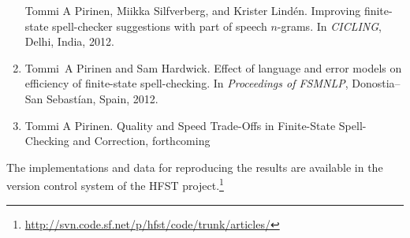 \documentclass[officiallayout,final]{unihelcompling}
\newcommand\misspelt{\bgroup\markoverwith
{\textcolor{red}{\lower3.5pt\hbox{\sixly \char58}}}\ULon}
\begin{document}
\begin{enumerate}
        Tommi A Pirinen, Miikka Silfverberg, and Krister Lindén.
        \newblock Improving finite-state spell-checker suggestions with part of
        speech \(n\)-grams.
        \newblock In {\em CICLING}, Delhi, India, 2012.
    \item[\citetalias{pirinen2012effects}]
        Tommi~A Pirinen and Sam Hardwick.
        \newblock Effect of language and error models on
        efficiency of finite-state spell-checking.
        \newblock In {\em Proceedings of FSMNLP}, Donostia--San Sebastían, Spain, 2012.
    \item[\citetalias{pirinen2013quality}]
        Tommi A Pirinen.
        \newblock Quality and Speed Trade-Offs in
        Finite-State Spell-Checking and Correction, forthcoming
\end{enumerate}

The implementations and data for reproducing the results are available
in the version control system of the HFST
project.\footnote{\url{http://svn.code.sf.net/p/hfst/code/trunk/articles/}}

\tableofcontents

\listoftables

\listoffigures

\listoftodos














\end{document}
